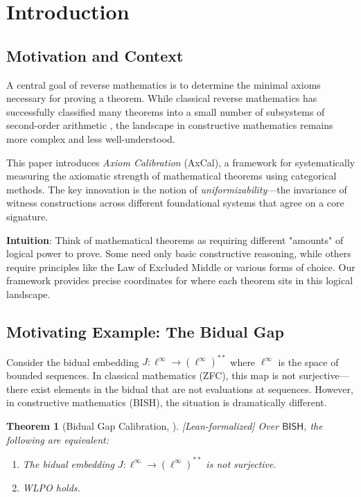 \documentclass[11pt]{article}
\theoremstyle{plain}
\newtheorem{theorem}{Theorem}[section]
\theoremstyle{definition}
\newcommand{\BISH}{\mathsf{BISH}}
\newcommand{\linf}{\ell^\infty}
\newcommand{\leanok}{\textsf{\textcolor{green!70!black}{[Lean-formalized]}}}
\begin{document}
\tableofcontents

\section{Introduction}

\subsection{Motivation and Context}

A central goal of reverse mathematics is to determine the minimal axioms necessary for proving a theorem. While classical reverse mathematics has successfully classified many theorems into a small number of subsystems of second-order arithmetic \cite{Simpson2009}, the landscape in constructive mathematics remains more complex and less well-understood.

This paper introduces \emph{Axiom Calibration} (AxCal), a framework for systematically measuring the axiomatic strength of mathematical theorems using categorical methods. The key innovation is the notion of \emph{uniformizability}—the invariance of witness constructions across different foundational systems that agree on a core signature.

\begin{intuitionbox}
\textbf{Intuition}: Think of mathematical theorems as requiring different "amounts" of logical power to prove. Some need only basic constructive reasoning, while others require principles like the Law of Excluded Middle or various forms of choice. Our framework provides precise coordinates for where each theorem sits in this logical landscape.
\end{intuitionbox}

\subsection{Motivating Example: The Bidual Gap}

Consider the bidual embedding $J: \linf \to (\linf)^{**}$ where $\linf$ is the space of bounded sequences. In classical mathematics (ZFC), this map is not surjective—there exist elements in the bidual that are not evaluations at sequences. However, in constructive mathematics (BISH), the situation is dramatically different.

\begin{theorem}[Bidual Gap Calibration, \cite{Paper2}]\label{thm:paper2} \leanok
Over $\BISH$, the following are equivalent:
\begin{enumerate}
\item The bidual embedding $J: \linf \to (\linf)^{**}$ is not surjective.
\item WLPO holds.
\end{enumerate}
\end{theorem}
\end{document}

